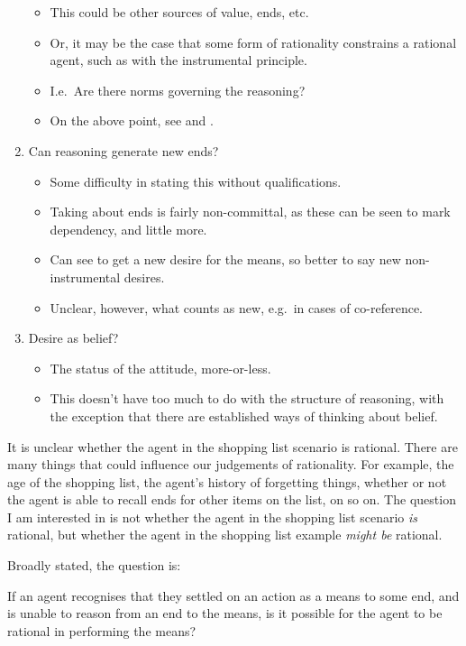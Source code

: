 \documentclass[10pt]{article}
\begin{document}
\begin{enumerate}
\begin{itemize}
  \item This could be other sources of value, ends, etc.
  \item Or, it may be the case that some form of rationality constrains a rational agent, such as with the instrumental principle.
  \item I.e.\ Are there norms governing the reasoning?
  \item On the above point, see \textcite{Raz:2005aa} and \textcite{Kolodny:2008aa,Kolodny:2007aa}.
  \end{itemize}
\item Can reasoning generate new ends?
  \begin{itemize}
  \item Some difficulty in stating this without qualifications.
  \item Taking about ends is fairly non-committal, as these can be seen to mark dependency, and little more.
  \item Can see to get a new desire for the means, so better to say new non-instrumental desires.
  \item Unclear, however, what counts as new, e.g.\ in cases of co-reference.
  \end{itemize}
\item Desire as belief?
  \begin{itemize}
  \item The status of the attitude, more-or-less.
  \item This doesn't have too much to do with the structure of reasoning, with the exception that there are established ways of thinking about belief.
  \end{itemize}


\end{enumerate}


\newpage

It is unclear whether the agent in the shopping list scenario is rational.
There are many things that could influence our judgements of rationality.
For example, the age of the shopping list, the agent's history of forgetting things, whether or not the agent is able to recall ends for other items on the list, on so on.
The question I am interested in is not whether the agent in the shopping list scenario \emph{is} rational, but whether the agent in the shopping list example \emph{might be} rational.

Broadly stated, the question is:

If an agent recognises that they settled on an action as a means to some end, and is unable to reason from an end to the means, is it possible for the agent to be rational in performing the means?
\end{document}
